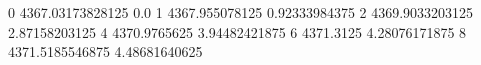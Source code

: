 0 4367.03173828125 0.0
1 4367.955078125 0.92333984375
2 4369.9033203125 2.87158203125
4 4370.9765625 3.94482421875
6 4371.3125 4.28076171875
8 4371.5185546875 4.48681640625
